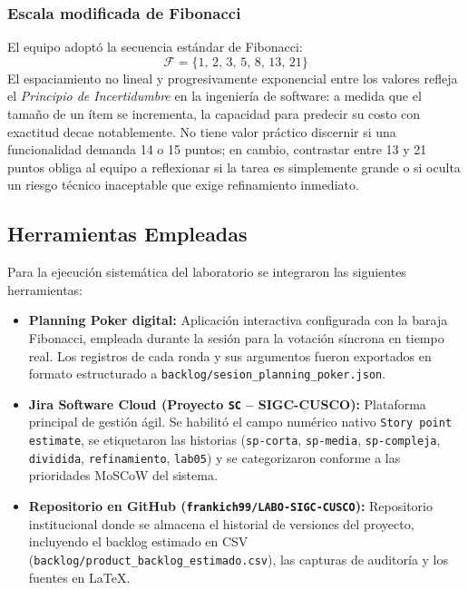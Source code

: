\subsubsection{Escala modificada de Fibonacci}
El equipo adoptó la secuencia estándar de Fibonacci:
\[
    \mathcal{F} = \{1,\, 2,\, 3,\, 5,\, 8,\, 13,\, 21\}
\]
El espaciamiento no lineal y progresivamente exponencial entre los valores refleja el \textit{Principio de Incertidumbre} en la ingeniería de software: a medida que el tamaño de un ítem se incrementa, la capacidad para predecir su costo con exactitud decae notablemente. No tiene valor práctico discernir si una funcionalidad demanda 14 o 15 puntos; en cambio, contrastar entre 13 y 21 puntos obliga al equipo a reflexionar si la tarea es simplemente grande o si oculta un riesgo técnico inaceptable que exige refinamiento inmediato.

\subsection{Herramientas Empleadas}

Para la ejecución sistemática del laboratorio se integraron las siguientes herramientas:
\begin{itemize}
    \item \textbf{Planning Poker digital:} Aplicación interactiva configurada con la baraja Fibonacci, empleada durante la sesión para la votación síncrona en tiempo real. Los registros de cada ronda y sus argumentos fueron exportados en formato estructurado a \texttt{backlog/sesion\_planning\_poker.json}.
    \item \textbf{Jira Software Cloud (Proyecto \texttt{SC} -- SIGC-CUSCO):} Plataforma principal de gestión ágil. Se habilitó el campo numérico nativo \texttt{Story point estimate}, se etiquetaron las historias (\texttt{sp-corta}, \texttt{sp-media}, \texttt{sp-compleja}, \texttt{dividida}, \texttt{refinamiento}, \texttt{lab05}) y se categorizaron conforme a las prioridades MoSCoW del sistema.
    \item \textbf{Repositorio en GitHub (\texttt{frankich99/LABO-SIGC-CUSCO}):} Repositorio institucional donde se almacena el historial de versiones del proyecto, incluyendo el backlog estimado en CSV (\texttt{backlog/product\_backlog\_estimado.csv}), las capturas de auditoría y los fuentes en \LaTeX{}.
\end{itemize}
